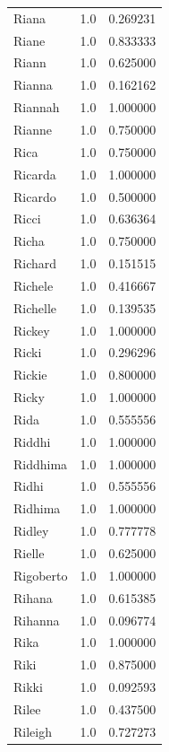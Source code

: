 \documentclass[
  letterpaper,
  DIV=11,
  numbers=noendperiod]{scrreprt}
\begin{document}
\begin{tabular}{lrr}
Riana           &   1.0 &   0.269231 \\
Riane           &   1.0 &   0.833333 \\
Riann           &   1.0 &   0.625000 \\
Rianna          &   1.0 &   0.162162 \\
Riannah         &   1.0 &   1.000000 \\
Rianne          &   1.0 &   0.750000 \\
Rica            &   1.0 &   0.750000 \\
Ricarda         &   1.0 &   1.000000 \\
Ricardo         &   1.0 &   0.500000 \\
Ricci           &   1.0 &   0.636364 \\
Richa           &   1.0 &   0.750000 \\
Richard         &   1.0 &   0.151515 \\
Richele         &   1.0 &   0.416667 \\
Richelle        &   1.0 &   0.139535 \\
Rickey          &   1.0 &   1.000000 \\
Ricki           &   1.0 &   0.296296 \\
Rickie          &   1.0 &   0.800000 \\
Ricky           &   1.0 &   1.000000 \\
Rida            &   1.0 &   0.555556 \\
Riddhi          &   1.0 &   1.000000 \\
Riddhima        &   1.0 &   1.000000 \\
Ridhi           &   1.0 &   0.555556 \\
Ridhima         &   1.0 &   1.000000 \\
Ridley          &   1.0 &   0.777778 \\
Rielle          &   1.0 &   0.625000 \\
Rigoberto       &   1.0 &   1.000000 \\
Rihana          &   1.0 &   0.615385 \\
Rihanna         &   1.0 &   0.096774 \\
Rika            &   1.0 &   1.000000 \\
Riki            &   1.0 &   0.875000 \\
Rikki           &   1.0 &   0.092593 \\
Rilee           &   1.0 &   0.437500 \\
Rileigh         &   1.0 &   0.727273 \\

\end{tabular}
\end{document}
